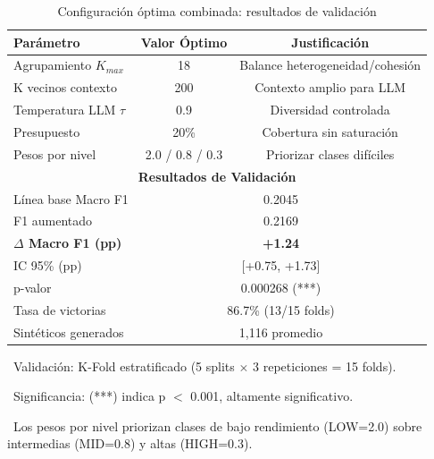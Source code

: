 \begin{table}[htbp]
\centering
\caption{Configuración óptima combinada: resultados de validación}
\label{tab:summary_optimal}
\begin{tabular}{lcc}
\toprule
\textbf{Parámetro} & \textbf{Valor Óptimo} & \textbf{Justificación} \\
\midrule
Agrupamiento $K_{max}$ & 18 & Balance heterogeneidad/cohesión \\
K vecinos contexto & 200 & Contexto amplio para LLM \\
Temperatura LLM $\tau$ & 0.9 & Diversidad controlada \\
Presupuesto & 20\% & Cobertura sin saturación \\
Pesos por nivel & 2.0 / 0.8 / 0.3 & Priorizar clases difíciles \\
\midrule
\multicolumn{3}{c}{\textbf{Resultados de Validación}} \\
\midrule
Línea base Macro F1 & \multicolumn{2}{c}{0.2045} \\
F1 aumentado & \multicolumn{2}{c}{0.2169} \\
\rowcolor{green!20}
\textbf{$\Delta$ Macro F1 (pp)} & \multicolumn{2}{c}{\textbf{+1.24}} \\
IC 95\% (pp) & \multicolumn{2}{c}{[+0.75, +1.73]} \\
p-valor & \multicolumn{2}{c}{0.000268 (***)} \\
Tasa de victorias & \multicolumn{2}{c}{86.7\% (13/15 folds)} \\
Sintéticos generados & \multicolumn{2}{c}{1,116 promedio} \\
\bottomrule
\end{tabular}
\vspace{0.5em}\footnotesize

\textbullet\ Validación: K-Fold estratificado (5 splits $\times$ 3 repeticiones = 15 folds).

\textbullet\ Significancia: (***) indica p $<$ 0.001, altamente significativo.

\textbullet\ Los pesos por nivel priorizan clases de bajo rendimiento (LOW=2.0) sobre intermedias (MID=0.8) y altas (HIGH=0.3).

\end{table}
